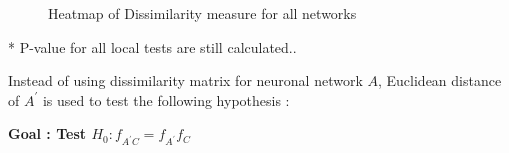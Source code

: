 \documentclass[12pt]{report}
\begin{document}
\begin{figure}[H]
\captionsetup{format=plain}
\caption{Heatmap of Dissimilarity measure for all networks}
\label{fig:table}    
\end{figure}


* P-value for all local tests are still calculated..


\newpage
Instead of using dissimilarity matrix for neuronal network $A$, Euclidean distance of $A^\prime$ is used to test the following hypothesis : 

\begin{center}\textbf{Goal : Test $H_{0} : f_{A^\prime C} = f_{A^\prime}f_{C}$}
\end{center}  
\end{document}
